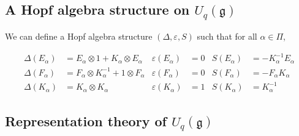         \subsection{A Hopf algebra structure on $U_q(\mathfrak{g})$}

        We can define a Hopf algebra structure $(\Delta, \varepsilon, S)$ such
        that for all $\alpha \in \Pi$,

        \begin{align}
            \Delta(E_\alpha) &= E_\alpha \otimes 1 + K_\alpha \otimes E_\alpha      & \varepsilon(E_\alpha) &= 0  & S(E_\alpha) &= -K_\alpha^{-1} E_\alpha \\
            \Delta(F_\alpha) &= F_\alpha \otimes K_\alpha^{-1} + 1 \otimes F_\alpha & \varepsilon(F_\alpha) &= 0  & S(F_\alpha) &= -F_\alpha K_\alpha \\
            \Delta(K_\alpha) &= K_\alpha \otimes K_\alpha                           & \varepsilon(K_\alpha) &= 1  & S(K_\alpha) &= K_\alpha^{-1}
        \end{align}
    \subsection{Representation theory of $U_q(\mathfrak{g})$}


